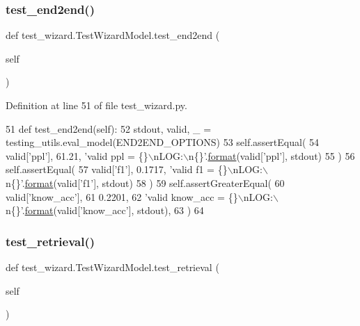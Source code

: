 \subsubsection{\texorpdfstring{test\+\_\+end2end()}{test\_end2end()}}
{\footnotesize\ttfamily def test\+\_\+wizard.\+Test\+Wizard\+Model.\+test\+\_\+end2end (\begin{DoxyParamCaption}\item[{}]{self }\end{DoxyParamCaption})}



Definition at line 51 of file test\+\_\+wizard.\+py.


\begin{DoxyCode}
51     \textcolor{keyword}{def }test\_end2end(self):
52         stdout, valid, \_ = testing\_utils.eval\_model(END2END\_OPTIONS)
53         self.assertEqual(
54             valid[\textcolor{stringliteral}{'ppl'}], 61.21, \textcolor{stringliteral}{'valid ppl = \{\}\(\backslash\)nLOG:\(\backslash\)n\{\}'}.\hyperlink{namespaceparlai_1_1chat__service_1_1services_1_1messenger_1_1shared__utils_a32e2e2022b824fbaf80c747160b52a76}{format}(valid[\textcolor{stringliteral}{'ppl'}], stdout)
55         )
56         self.assertEqual(
57             valid[\textcolor{stringliteral}{'f1'}], 0.1717, \textcolor{stringliteral}{'valid f1 = \{\}\(\backslash\)nLOG:\(\backslash\)n\{\}'}.\hyperlink{namespaceparlai_1_1chat__service_1_1services_1_1messenger_1_1shared__utils_a32e2e2022b824fbaf80c747160b52a76}{format}(valid[\textcolor{stringliteral}{'f1'}], stdout)
58         )
59         self.assertGreaterEqual(
60             valid[\textcolor{stringliteral}{'know\_acc'}],
61             0.2201,
62             \textcolor{stringliteral}{'valid know\_acc = \{\}\(\backslash\)nLOG:\(\backslash\)n\{\}'}.\hyperlink{namespaceparlai_1_1chat__service_1_1services_1_1messenger_1_1shared__utils_a32e2e2022b824fbaf80c747160b52a76}{format}(valid[\textcolor{stringliteral}{'know\_acc'}], stdout),
63         )
64 
\end{DoxyCode}
\mbox{\label{classtest__wizard_1_1TestWizardModel_a31b902bf6fff3ccfc8fe52228c2fc20f}} 
\subsubsection{\texorpdfstring{test\+\_\+retrieval()}{test\_retrieval()}}
{\footnotesize\ttfamily def test\+\_\+wizard.\+Test\+Wizard\+Model.\+test\+\_\+retrieval (\begin{DoxyParamCaption}\item[{}]{self }\end{DoxyParamCaption})}



